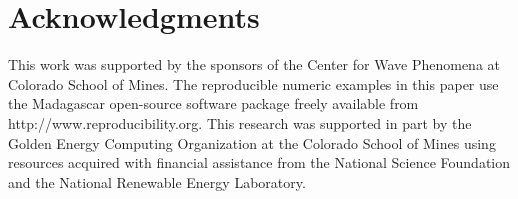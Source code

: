 \section{Acknowledgments}
This work was supported by the sponsors of the Center for Wave Phenomena at Colorado School of Mines.
%
The reproducible numeric examples in this paper use the Madagascar open-source software package freely available from http://www.reproducibility.org.
%
This research was supported in part by the Golden Energy Computing Organization at the Colorado School of Mines using resources acquired with financial assistance from the National Science Foundation and the National Renewable Energy Laboratory.



